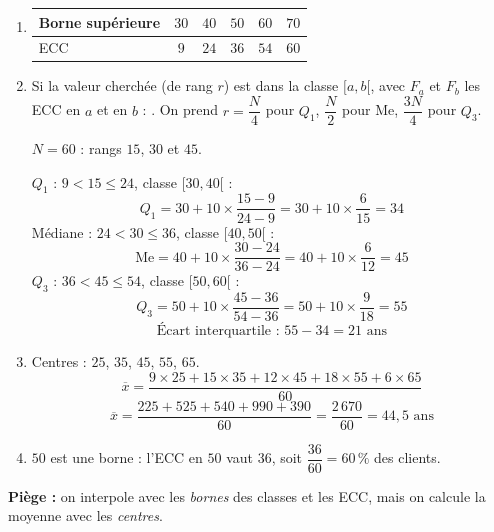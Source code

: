 \begin{enumerate}[itemsep=14pt]
  \item
  \begin{center}
  \begin{tabular}{|l|c|c|c|c|c|}\hline
  Borne supérieure & $30$ & $40$ & $50$ & $60$ & $70$ \\\hline
  ECC & $9$ & $24$ & $36$ & $54$ & $60$ \\\hline
  \end{tabular}\end{center}

  \item
  \begin{prop}
  Si la valeur cherchée (de rang $r$) est dans la classe $[a,b[$, avec $F_a$ et $F_b$ les ECC en $a$ et en $b$ :
  . On prend $r=\dfrac N4$ pour $Q_1$, $\dfrac N2$ pour Me, $\dfrac{3N}{4}$ pour $Q_3$.
  \end{prop}
  $N=60$ : rangs $15$, $30$ et $45$.

  $Q_1$ : $9<15\leq24$, classe $[30,40[$ :
  \[Q_1=30+10\times\dfrac{15-9}{24-9}=30+10\times\dfrac{6}{15}=34\]
  Médiane : $24<30\leq36$, classe $[40,50[$ :
  \[\text{Me}=40+10\times\dfrac{30-24}{36-24}=40+10\times\dfrac{6}{12}=45\]
  $Q_3$ : $36<45\leq54$, classe $[50,60[$ :
  \[Q_3=50+10\times\dfrac{45-36}{54-36}=50+10\times\dfrac{9}{18}=55\]
  \[\text{Écart interquartile : }55-34=21\text{ ans}\]

  \item Centres : $25$, $35$, $45$, $55$, $65$.
  \[\overline x=\dfrac{9\times25+15\times35+12\times45+18\times55+6\times65}{60}\]
  \[\overline x=\dfrac{225+525+540+990+390}{60}=\dfrac{2\,670}{60}=44{,}5\text{ ans}\]

  \item $50$ est une borne : l'ECC en $50$ vaut $36$, soit $\dfrac{36}{60}=60\,\%$ des clients.
\end{enumerate}
\textbf{Piège :} on interpole avec les \emph{bornes} des classes et les ECC, mais on calcule la moyenne avec les \emph{centres}.
